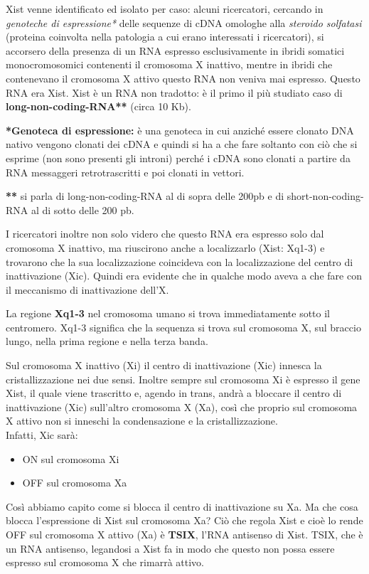 \documentclass[11pt]{book}
\begin{document}
Xist venne identificato ed isolato per caso: alcuni ricercatori, cercando in \emph{genoteche di espressione*} delle sequenze di cDNA omologhe alla \emph{steroido solfatasi} (proteina coinvolta nella patologia a cui erano interessati i ricercatori), si accorsero della presenza di un RNA espresso esclusivamente in ibridi somatici monocromosomici contenenti il cromosoma X inattivo, mentre in ibridi che contenevano il cromosoma X attivo questo RNA non veniva mai espresso. Questo RNA era Xist.
Xist è un RNA non tradotto: è il primo il più studiato caso di \textbf{long-non-coding-RNA**} (circa 10 Kb).

\textbf{*Genoteca di espressione:} è una genoteca in cui anziché essere clonato DNA nativo vengono clonati dei cDNA e quindi si ha a che fare soltanto con ciò che si esprime (non sono presenti gli introni) perché i cDNA sono clonati a partire da RNA messaggeri retrotrascritti e poi clonati in vettori.

\textbf{**} si parla di long-non-coding-RNA al di sopra delle 200pb e di short-non-coding-RNA al di sotto delle 200 pb.

I ricercatori inoltre non solo videro che questo RNA era espresso solo dal cromosoma X inattivo, ma riuscirono anche a localizzarlo (Xist: Xq1-3) e trovarono che la sua localizzazione coincideva con la localizzazione del centro di inattivazione (Xic). Quindi era evidente che in qualche modo aveva a che fare con il meccanismo di inattivazione dell’X.

La regione \textbf{Xq1-3} nel cromosoma umano si trova immediatamente sotto il centromero. Xq1-3 significa che la sequenza si trova sul cromosoma X, sul braccio lungo, nella prima regione e nella terza banda. 

Sul cromosoma X inattivo (Xi) il centro di inattivazione (Xic) innesca la cristallizzazione nei due sensi. Inoltre sempre sul cromosoma Xi è espresso il gene Xist, il quale viene trascritto e, agendo in trans, andrà a bloccare il centro di inattivazione (Xic) sull’altro cromosoma X (Xa), così che proprio sul cromosoma X attivo non si inneschi la condensazione e la cristallizzazione.\\
Infatti, Xic sarà:
\begin{itemize}
\item ON sul cromosoma Xi
\item OFF sul cromosoma Xa
\end{itemize}

Così abbiamo capito come si blocca il centro di inattivazione su Xa. Ma che cosa blocca l’espressione di Xist sul cromosoma Xa? Ciò che regola Xist e cioè lo rende OFF sul cromosoma X attivo (Xa) è \textbf{TSIX}, l'RNA antisenso di Xist. TSIX, che è un RNA antisenso, legandosi a Xist fa in modo che questo non possa essere espresso sul cromosoma X che rimarrà attivo.
\end{document}
